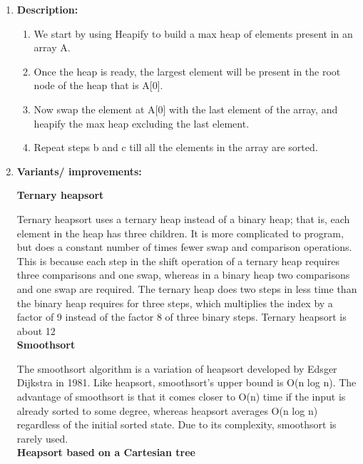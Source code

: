 \documentclass[11pt,a4paper]{article}
\begin{document}
{\begin{enumerate}[label=\textbf{\arabic*})]
				\item \textbf{Description:}
					\begin{enumerate}
						\item We start by using Heapify to build a max heap of elements present in an array A.
						\item Once the heap is ready, the largest element will be present in the root node of the heap that is A[0].
						\item Now swap the element at A[0] with the last element of the array, and heapify the max heap excluding the last element.
						\item Repeat steps b and c till all the elements in the array are sorted.
					\end{enumerate}
				\item \textbf{Variants/ improvements:}
				
					\textbf{Ternary heapsort}
					
					Ternary heapsort uses a ternary heap instead of a binary heap; that is, each element in the heap has three children. It is more complicated to program, but does a constant number of times fewer swap and comparison operations. This is because each step in the shift operation of a ternary heap requires three comparisons and one swap, whereas in a binary heap two comparisons and one swap are required. The ternary heap does two steps in less time than the binary heap requires for three steps, which multiplies the index by a factor of 9 instead of the factor 8 of three binary steps. Ternary heapsort is about 12%
					\\[9pt]
					\textbf{Smoothsort}
					
					The smoothsort algorithm is a variation of heapsort developed by Edsger Dijkstra in 1981. Like heapsort, smoothsort's upper bound is O(n log n). The advantage of smoothsort is that it comes closer to O(n) time if the input is already sorted to some degree, whereas heapsort averages O(n log n) regardless of the initial sorted state. Due to its complexity, smoothsort is rarely used.
					\\[9pt]
					\textbf{Heapsort based on a Cartesian tree}
					

\end{enumerate}}
\end{document}
